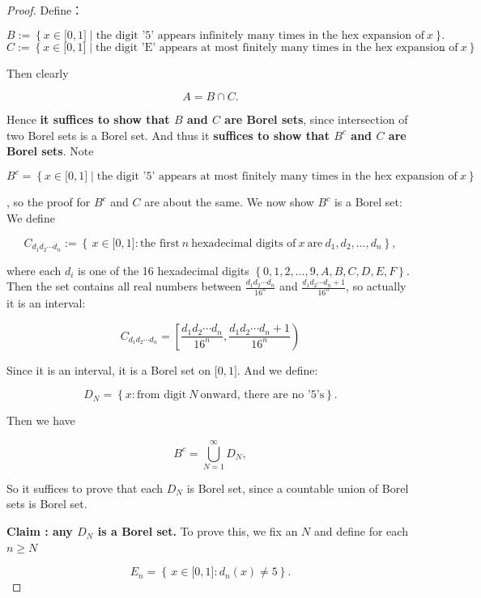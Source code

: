 \begin{proof}

Define：

\[B := \left\{ {x \in \lbrack 0,1\rbrack \mid \text{the digit ’5’ appears infinitely many times in the hex expansion of}\ x} \right\}.\]\[C := \left\{ {x \in \lbrack 0,1\rbrack \mid \text{the digit ’E’ appears at most finitely many times in the hex expansion of}\ x} \right\}.\]

Then clearly

\[A = B \cap C.\]

Hence \textbf{it suffices to show that \(B\) and \(C\) are Borel sets}, since intersection of two Borel sets is a Borel set. And thus it \textbf{suffices to show that \(B^{c}\) and \(C\) are Borel sets}. Note

\[B^{c} = \left\{ {x \in \lbrack 0,1\rbrack \mid \text{the digit ’5’ appears at most finitely many times in the hex expansion of}\ x} \right\}\]

, so the proof for \(B^{c}\) and \(C\) are about the same. We now show \(B^{c}\) is a Borel set: We define

\[C_{d_{1}d_{2}\cdots d_{n}} := \left\{ {\, x \in \lbrack 0,1\rbrack:\text{the first}\ n\ \text{hexadecimal digits of}\ x\ \text{are}\ d_{1},d_{2},\ldots,d_{n}} \right\},\]

where each \(d_{i}\) is one of the 16 hexadecimal digits \(\left\{ {0,1,2,\ldots,9,A,B,C,D,E,F} \right\}\). Then the set contains all real numbers between \(\frac{d_{1}d_{2}\cdots d_{n}}{16^{n}}\) and \(\frac{d_{1}d_{2}\cdots d_{n} + 1}{16^{n}}\), so actually it is an interval:

\[C_{d_{1}d_{2}\cdots d_{n}} = \left\lbrack {\frac{d_{1}d_{2}\cdots d_{n}}{16^{n}},\frac{d_{1}d_{2}\cdots d_{n} + 1}{16^{n}}} \right)\]

Since it is an interval, it is a Borel set on \(\lbrack 0,1\rbrack\). And we define:

\[D_{N} = \left\{ {x:\text{from digit}\ N\ \text{onward, there are no ’5’s}} \right\}.\]

Then we have

\[B^{c} = \bigcup\limits_{N = 1}^{\infty}D_{N},\]

So it suffices to prove that each \(D_{N}\) is Borel set, since a countable union of Borel sets is Borel set.

\textbf{Claim : any \(D_{N}\) is a Borel set.} To prove this, we fix an \(N\) and define for each \(n \geq N\)

\[E_{n} = \left\{ {\, x \in \lbrack 0,1\rbrack:d_{n}(x) \neq 5} \right\}.\]


\end{proof}
